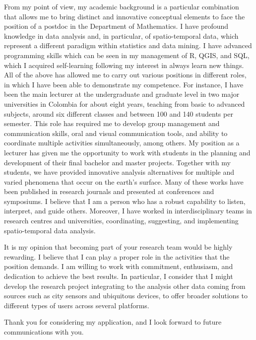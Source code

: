 \documentclass[11pt, a4paper]{awesome-cv}
\begin{document}
\begin{cvletter}

From my point of view, my academic background is a particular combination that allows me to bring distinct and innovative conceptual elements to face the position of a postdoc in the Department of Mathematics. I have profound knowledge in data analysis and, in particular, of spatio-temporal data, which represent a different paradigm within statistics and data mining. I have advanced programming skills which can be seen in my management of R, QGIS, and SQL, which I acquired self-learning following my interest in always learn new things. All of the above has allowed me to carry out various positions in different roles, in which I have been able to demonstrate my competence. For instance, I have been the main lecturer at the undergraduate and graduate level in two major universities in Colombia for about eight years, teaching from basic to advanced subjects, around six different classes and between 100 and 140 students per semester. This role has required me to develop group management and communication skills, oral and visual communication tools, and ability to coordinate multiple activities simultaneously, among others. My position as a lecturer has given me the opportunity to work with students in the planning and development of their final bachelor and master projects. Together with my students, we have provided innovative analysis alternatives for multiple and varied phenomena that occur on the earth's surface. Many of these works have been published in research journals and presented at conferences and symposiums. I believe that I am a person who has a robust capability to listen, interpret, and guide others. Moreover, I have worked in interdisciplinary teams in research centres and universities, coordinating, suggesting, and implementing spatio-temporal data analysis. \par
It is my opinion that becoming part of your research team would be highly rewarding. I believe that I can play a proper role in the activities that the position demands. I am willing to work with commitment, enthusiasm, and dedication to achieve the best results. In particular, I consider that I might develop the research project integrating to the analysis other data coming from sources such as city sensors and ubiquitous devices, to offer broader solutions to different types of users across several platforms.\par\bigskip
Thank you for considering my application, and I look forward to future communications with you.
\end{cvletter}


\makeletterclosing
\end{document}
